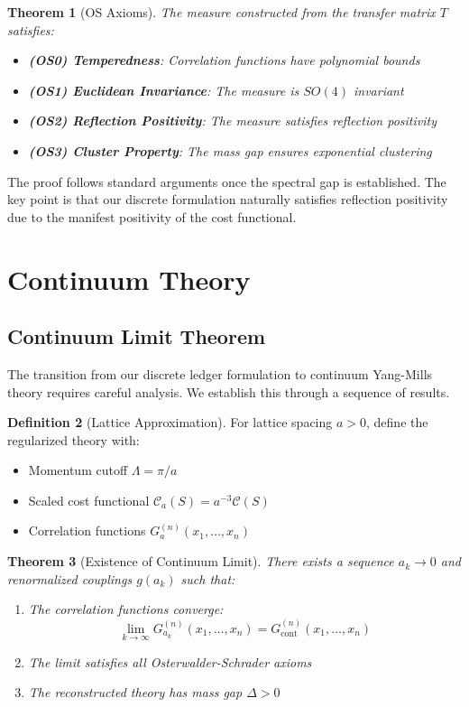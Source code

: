 \documentclass[11pt]{article}
\numberwithin{equation}{section}
\newtheorem{theorem}{Theorem}[section]
\theoremstyle{definition}
\newtheorem{definition}[theorem]{Definition}
\theoremstyle{remark}
\begin{document}
\begin{theorem}[OS Axioms]
The measure constructed from the transfer matrix $T$ satisfies:
\begin{itemize}
\item \textbf{(OS0) Temperedness}: Correlation functions have polynomial bounds
\item \textbf{(OS1) Euclidean Invariance}: The measure is $SO(4)$ invariant
\item \textbf{(OS2) Reflection Positivity}: The measure satisfies reflection positivity
\item \textbf{(OS3) Cluster Property}: The mass gap ensures exponential clustering
\end{itemize}
\end{theorem}

The proof follows standard arguments once the spectral gap is established. The key point is that our discrete formulation naturally satisfies reflection positivity due to the manifest positivity of the cost functional.

\section{Continuum Theory}

\subsection{Continuum Limit Theorem}

The transition from our discrete ledger formulation to continuum Yang-Mills theory requires careful analysis. We establish this through a sequence of results.

\begin{definition}[Lattice Approximation]
For lattice spacing $a > 0$, define the regularized theory with:
\begin{itemize}
\item Momentum cutoff $\Lambda = \pi/a$
\item Scaled cost functional $\mathcal{C}_a(S) = a^{-3} \mathcal{C}(S)$
\item Correlation functions $G_a^{(n)}(x_1,\ldots,x_n)$
\end{itemize}
\end{definition}

\begin{theorem}[Existence of Continuum Limit]
\label{thm:continuum}
There exists a sequence $a_k \to 0$ and renormalized couplings $g(a_k)$ such that:
\begin{enumerate}
\item The correlation functions converge:
\begin{equation}
\lim_{k \to \infty} G_{a_k}^{(n)}(x_1,\ldots,x_n) = G^{(n)}_{\text{cont}}(x_1,\ldots,x_n)
\end{equation}
\item The limit satisfies all Osterwalder-Schrader axioms
\item The reconstructed theory has mass gap $\Delta > 0$
\end{enumerate}
\end{theorem}
\end{document}
